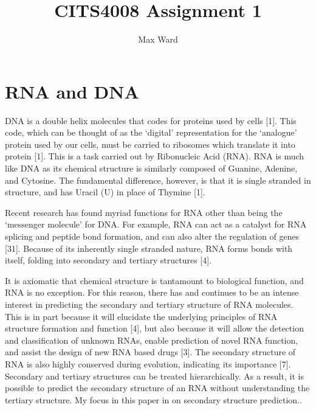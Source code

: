 \documentclass[12pt, a4paper]{article}
\title{CITS4008 Assignment 1}
\author{Max Ward}
\date{}
\begin{document}
\maketitle

\section*{RNA and DNA} DNA is a double helix molecules that codes for proteins used by cells [1]. This
code, which can be thought of as the `digital' representation for the `analogue'
protein used by our cells, must be carried to ribosomes which translate it into
protein [1]. This is a task carried out by Ribonucleic Acid (RNA). RNA is much like DNA as its chemical structure is similarly composed of Guanine, Adenine, and Cytosine. The fundamental difference, however, is that it is single stranded in structure, and has Uracil (U) in place of Thymine [1].

Recent research has found myriad functions for RNA other than being the ‘messenger molecule’ for DNA. For example, RNA can act as a catalyst for RNA
splicing and peptide bond formation, and can also alter the regulation of genes
[31]. Because of its inherently single stranded nature, RNA forms bonds with itself, folding into
secondary and tertiary structures [4].

It is axiomatic that chemical structure is tantamount to biological function, and RNA is no exception. For this reason, there has and continues to be an intense
interest in predicting the secondary and tertiary structure of RNA
molecules. This is in part because it will elucidate the underlying principles of
RNA structure formation and function [4], but also because it will allow the
detection and classification of unknown RNAs, enable prediction of novel RNA
function, and assist the design of new RNA based drugs [3]. The secondary structure of RNA
is also highly conserved during evolution, indicating its importance [7]. Secondary
and tertiary structures can be treated hierarchically. As a result, it is possible to
predict the secondary structure of an RNA without understanding the tertiary
structure. My focus in this paper in on secondary structure prediction..
\end{document}

